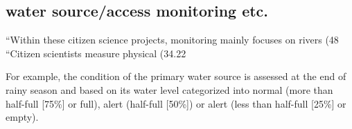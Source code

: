 \subsection{water source/access monitoring etc.}


“Within these citizen science projects, monitoring mainly focuses on rivers (48%
“Citizen scientists measure physical (34.22%

For example, the condition of the primary water source is assessed at the end of rainy season and based on its water level categorized into normal (more than half-full [75\%] or full), alert (half-full [50\%]) or alert (less than half-full [25\%] or empty).


